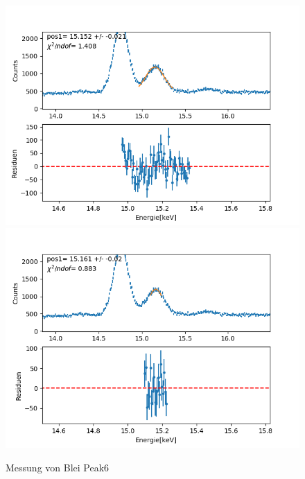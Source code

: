 \documentclass[12pt,a4paper]{article}
\begin{document}
\begin{figure}[H]
\centering
\includegraphics[scale=0.49]{Bilder/roentgen_spektren/blei/pb6_1.png}
\includegraphics[scale=0.49]{Bilder/roentgen_spektren/blei/pb6_2.png}
\caption{Messung von Blei Peak6}
\end{figure}
\end{document}

